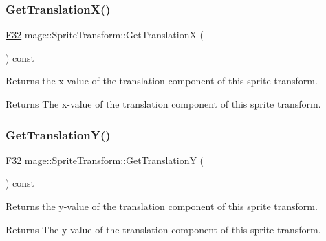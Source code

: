 \subsubsection{\texorpdfstring{Get\+Translation\+X()}{GetTranslationX()}}
{\footnotesize\ttfamily \mbox{\hyperlink{namespacemage_aa97e833b45f06d60a0a9c4fc22ae02c0}{F32}} mage\+::\+Sprite\+Transform\+::\+Get\+TranslationX (\begin{DoxyParamCaption}{ }\end{DoxyParamCaption}) const\hspace{0.3cm}{\ttfamily [noexcept]}}

Returns the x-\/value of the translation component of this sprite transform.

\begin{DoxyReturn}{Returns}
The x-\/value of the translation component of this sprite transform. 
\end{DoxyReturn}
\mbox{\label{classmage_1_1_sprite_transform_a45ac68b47fb751b8c3908524177c37c8}} 
\subsubsection{\texorpdfstring{Get\+Translation\+Y()}{GetTranslationY()}}
{\footnotesize\ttfamily \mbox{\hyperlink{namespacemage_aa97e833b45f06d60a0a9c4fc22ae02c0}{F32}} mage\+::\+Sprite\+Transform\+::\+Get\+TranslationY (\begin{DoxyParamCaption}{ }\end{DoxyParamCaption}) const\hspace{0.3cm}{\ttfamily [noexcept]}}

Returns the y-\/value of the translation component of this sprite transform.

\begin{DoxyReturn}{Returns}
The y-\/value of the translation component of this sprite transform. 
\end{DoxyReturn}
\mbox{\label{classmage_1_1_sprite_transform_af0adccff92d48e7b347e66277981ee07}} 
